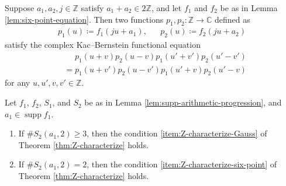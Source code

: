 \documentclass[10pt,a4paper]{amsart}
\DeclareMathOperator{\supp}{supp}
\begin{document}
\begin{lemma}
    \label{lem:scaling}

Suppose $ a_1 , a_2 , j \in \mathbb{ Z } $ satisfy $ a_1 + a_2 \in 2 \mathbb{ Z } $, and let $ f_1 $ and $ f_2 $ be as in Lemma \ref{lem:six-point-equation}.
Then two functions $ p_1 , p_2 \colon \mathbb{ Z } \to \mathbb{ C } $ defined as 
\begin{align}
    p_1 ( u ) \coloneqq f_1 ( j u + a_1 ), & &
    p_2 ( u ) \coloneqq f_2 ( j u + a_2 )
\end{align}
satisfy the complex Kac--Bernstein functional equation 
\begin{align}
  & \phantom{ {} = {} }  p_1 ( u + v ) p_2 ( u - v ) p_1 ( u' + v' ) p_2 ( u' - v' ) \\
  & = p_1 ( u + v' ) p_2 ( u - v' ) p_1 ( u' + v ) p_2 ( u' - v ) \label{eq:scaling-main}
\end{align}
for any $ u , u' , v , v' \in \mathbb{ Z } $.
    
\end{lemma}

\begin{lemma}
    \label{lem:supp-large-Gauss}

Let $ f_1$, $ f_2 $, $ S_1$, and $ S_2 $ be as in Lemma \ref{lem:supp-arithmetic-progression}, and $ a_1 \in \supp f_1 $.

\begin{enumerate}
    \item \label{item:supp-large-Gauss-large}

If $ \# S_2 ( a_1 , 2 ) \geq 3 $, then the condition \ref{item:Z-characterize-Gauss} of Theorem \ref{thm:Z-characterize} holds.

\item \label{item:supp-large-Gauss-number-2}

If $ \# S_2 ( a_1 , 2 ) = 2 $, then the condition \ref{item:Z-characterize-six-point} of Theorem \ref{thm:Z-characterize} holds.
    
\end{enumerate}

\end{lemma}
\end{document}
